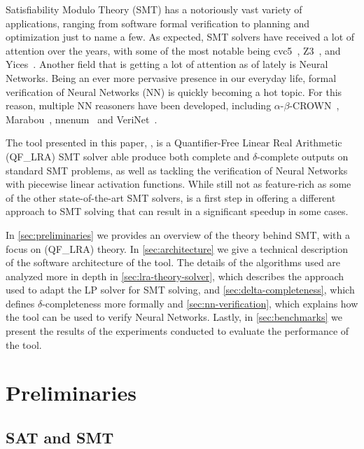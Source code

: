 \documentclass[runningheads]{llncs}
\begin{document}
Satisfiability Modulo Theory (SMT) has a notoriously vast variety of applications, ranging from software formal verification to planning and optimization just to name a few.
As expected, SMT solvers have received a lot of attention over the years, with some of the most notable being cvc5~\cite{ref:cvc5}, Z3~\cite{ref:z3}, and Yices~\cite{ref:yices}.
Another field that is getting a lot of attention as of lately is Neural Networks.
Being an ever more pervasive presence in our everyday life, formal verification of Neural Networks (NN) is quickly becoming a hot topic.
For this reason, multiple NN reasoners have been developed, including $\alpha$-$\beta$-CROWN~\cite{ref:a-crown,ref:b-crown,ref:crown,ref:lirpa}, Marabou~\cite{ref:marabou}, nnenum~\cite{ref:nnenum} and VeriNet~\cite{ref:verinet}.

The tool presented in this paper, \dlinear, is a Quantifier-Free Linear Real Arithmetic (QF\_LRA) SMT solver able produce both complete and $\delta$-complete outputs on standard SMT problems,
as well as tackling the verification of Neural Networks with piecewise linear activation functions.
While still not as feature-rich as some of the other state-of-the-art SMT solvers, \dlinear is a first step in offering a different approach to SMT solving that can result in a significant speedup in some cases.

In \autoref{sec:preliminaries} we provides an overview of the theory behind SMT, with a focus on (QF\_LRA) theory.
In \autoref{sec:architecture} we give a technical description of the software architecture of the tool.
The details of the algorithms used are analyzed more in depth in \autoref{sec:lra-theory-solver}, which describes the approach used to adapt the LP solver for SMT solving, and \autoref{sec:delta-completeness}, which defines $\delta$-completeness more formally and \autoref{sec:nn-verification}, which explains how the tool can be used to verify Neural Networks.
Lastly, in \autoref{sec:benchmarks} we present the results of the experiments conducted to evaluate the performance of the tool.

\section{Preliminaries}
\label{sec:preliminaries}

\subsection{SAT and SMT}
\end{document}
